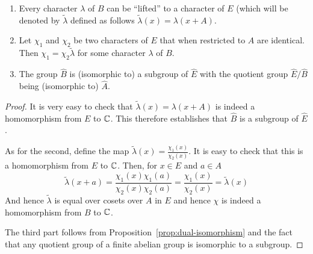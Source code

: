 \documentclass[11pt]{article}
\begin{document}
\begin{proposition}\label{prop-character-lift}
  \begin{enumerate}
  \item Every character $\lambda$ of $B$ can be ``lifted'' to a
    character of $E$ (which will be denoted by $\tilde\lambda$ defined
    as follows $\tilde\lambda(x) = \lambda(x + A)$.
  \item Let $\chi_1$ and $\chi_2$ be two characters of $E$ that when
    restricted to $A$ are identical. Then $\chi_1 = \chi_2 \tilde\lambda$ for
    some character $\lambda$ of $B$.
  \item The group $\hat{B}$ is (isomorphic to) a subgroup of $\hat{E}$
    with the quotient group $\hat{E}/\hat{B}$ being (isomorphic to)
    $\hat{A}$.
  \end{enumerate}
\end{proposition}
\begin{proof}
It is very easy to check that $\tilde\lambda(x) = \lambda(x + A)$ is indeed
a homomorphism from $E$ to $\mathbb{C}$. This therefore establishes that
$\hat{B}$ is a subgroup of $\hat{E}$.

\medskip As for the second, define the map $\tilde\lambda(x) =
\frac{\chi_1(x)}{\chi_2(x)}$. It is easy to check that this is a
homomorphism from $E$ to $\mathbb{C}$. Then, for $x\in E$ and $a\in A$
$$
\tilde\lambda(x + a) = \frac{\chi_1(x)\chi_1(a)}{\chi_2(x)\chi_2(a)} =
\frac{\chi_1(x)}{\chi_2(x)} = \tilde\lambda(x)
$$
And hence $\tilde\lambda$ is equal over cosets over $A$ in $E$ and hence $\chi$
is indeed a homomorphism from $B$ to $\mathbb{C}$.

\medskip The third part follows from
Proposition~\ref{prop:dual-isomorphism} and the fact that any quotient
group of a finite abelian group is isomorphic to a subgroup.
\end{proof}
\end{document}
